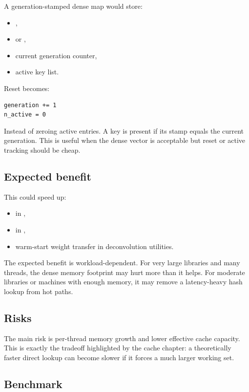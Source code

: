 \documentclass[11pt]{article}
\begin{document}
A generation-stamped dense map would store:

\begin{itemize}
  \item {},
  \item {} or ,
  \item current generation counter,
  \item active key list.
\end{itemize}

Reset becomes:

\begin{verbatim}
generation += 1
n_active = 0
\end{verbatim}

Instead of zeroing active entries. A key is present if its stamp equals the
current generation. This is useful when the dense vector is acceptable but reset
or active tracking should be cheap.

\subsection*{Expected benefit}

This could speed up:

\begin{itemize}
  \item {} in ,
  \item {} in ,
  \item warm-start weight transfer in deconvolution utilities.
\end{itemize}

The expected benefit is workload-dependent. For very large libraries and many
threads, the dense memory footprint may hurt more than it helps. For moderate
libraries or machines with enough memory, it may remove a latency-heavy hash
lookup from hot paths.

\subsection*{Risks}

The main risk is per-thread memory growth and lower effective cache capacity.
This is exactly the tradeoff highlighted by the cache chapter: a theoretically
faster direct lookup can become slower if it forces a much larger working set.

\subsection*{Benchmark}
\end{document}
